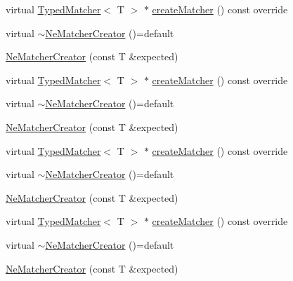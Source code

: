 \begin{DoxyCompactItemize}
virtual \mbox{\hyperlink{structfakeit_1_1TypedMatcher}{Typed\+Matcher}}$<$ T $>$ $\ast$ \mbox{\hyperlink{structfakeit_1_1internal_1_1NeMatcherCreator_a5207ab2452c0d075a629b828115716cb}{create\+Matcher}} () const override
\item 
virtual \mbox{\hyperlink{structfakeit_1_1internal_1_1NeMatcherCreator_a8a1d7213f8e7611867a812de3e4310a9}{$\sim$\+Ne\+Matcher\+Creator}} ()=default
\item 
\mbox{\hyperlink{structfakeit_1_1internal_1_1NeMatcherCreator_a15ad0bf386a46786631d4f46b730e646}{Ne\+Matcher\+Creator}} (const T \&expected)
\item 
virtual \mbox{\hyperlink{structfakeit_1_1TypedMatcher}{Typed\+Matcher}}$<$ T $>$ $\ast$ \mbox{\hyperlink{structfakeit_1_1internal_1_1NeMatcherCreator_a5207ab2452c0d075a629b828115716cb}{create\+Matcher}} () const override
\item 
virtual \mbox{\hyperlink{structfakeit_1_1internal_1_1NeMatcherCreator_a8a1d7213f8e7611867a812de3e4310a9}{$\sim$\+Ne\+Matcher\+Creator}} ()=default
\item 
\mbox{\hyperlink{structfakeit_1_1internal_1_1NeMatcherCreator_a15ad0bf386a46786631d4f46b730e646}{Ne\+Matcher\+Creator}} (const T \&expected)
\item 
virtual \mbox{\hyperlink{structfakeit_1_1TypedMatcher}{Typed\+Matcher}}$<$ T $>$ $\ast$ \mbox{\hyperlink{structfakeit_1_1internal_1_1NeMatcherCreator_a5207ab2452c0d075a629b828115716cb}{create\+Matcher}} () const override
\item 
virtual \mbox{\hyperlink{structfakeit_1_1internal_1_1NeMatcherCreator_a8a1d7213f8e7611867a812de3e4310a9}{$\sim$\+Ne\+Matcher\+Creator}} ()=default
\item 
\mbox{\hyperlink{structfakeit_1_1internal_1_1NeMatcherCreator_a15ad0bf386a46786631d4f46b730e646}{Ne\+Matcher\+Creator}} (const T \&expected)
\item 
virtual \mbox{\hyperlink{structfakeit_1_1TypedMatcher}{Typed\+Matcher}}$<$ T $>$ $\ast$ \mbox{\hyperlink{structfakeit_1_1internal_1_1NeMatcherCreator_a5207ab2452c0d075a629b828115716cb}{create\+Matcher}} () const override
\item 
virtual \mbox{\hyperlink{structfakeit_1_1internal_1_1NeMatcherCreator_a8a1d7213f8e7611867a812de3e4310a9}{$\sim$\+Ne\+Matcher\+Creator}} ()=default
\item 
\mbox{\hyperlink{structfakeit_1_1internal_1_1NeMatcherCreator_a15ad0bf386a46786631d4f46b730e646}{Ne\+Matcher\+Creator}} (const T \&expected)
\item 

\end{DoxyCompactItemize}
